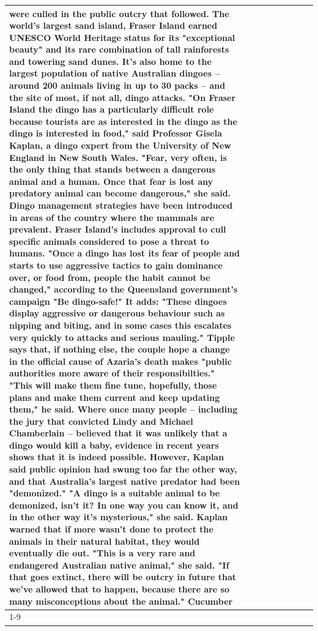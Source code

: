 \begin{table}[H]
\begin{tabular}{lllrlllll}
were culled in the public outcry that followed. The world's largest sand island, Fraser Island earned UNESCO World Heritage status for its "exceptional beauty" and its rare combination of tall rainforests and towering sand dunes. It's also home to the largest population of native Australian dingoes -- around 200 animals living in up to 30 packs -- and the site of most, if not all, dingo attacks. "On Fraser Island the dingo has a particularly difficult role because tourists are as interested in the dingo as the dingo is interested in food," said Professor Gisela Kaplan, a dingo expert from the University of New England in New South Wales. "Fear, very often, is the only thing that stands between a dangerous animal and a human. Once that fear is lost any predatory animal can become dangerous," she said. Dingo management strategies have been introduced in areas of the country where the mammals are prevalent. Fraser Island's includes approval to cull specific animals considered to pose a threat to humans. "Once a dingo has lost its fear of people and starts to use aggressive tactics to gain dominance over, or food from, people the habit cannot be changed," according to the Queensland government's campaign "Be dingo-safe!" It adds: "These dingoes display aggressive or dangerous behaviour such as nipping and biting, and in some cases this escalates very quickly to attacks and serious mauling." Tipple says that, if nothing else, the couple hope a change in the official cause of Azaria's death makes "public authorities more aware of their responsibilties." "This will make them fine tune, hopefully, those plans and make them current and keep updating them," he said. Where once many people -- including the jury that convicted Lindy and Michael Chamberlain -- believed that it was unlikely that a dingo would kill a baby, evidence in recent years shows that it is indeed possible. However, Kaplan said public opinion had swung too far the other way, and that Australia's largest native predator had been "demonized." "A dingo is a suitable animal to be demonized, isn't it? In one way you can know it, and in the other way it's mysterious," she said. Kaplan warned that if more wasn't done to protect the animals in their natural habitat, they would eventually die out. "This is a very rare and endangered Australian native animal," she said. "If that goes extinct, there will be outcry in future that we've allowed that to happen, because there are so many misconceptions about the animal." Cucumber \\
\cline{1-9}

\end{tabular}
\end{table}
